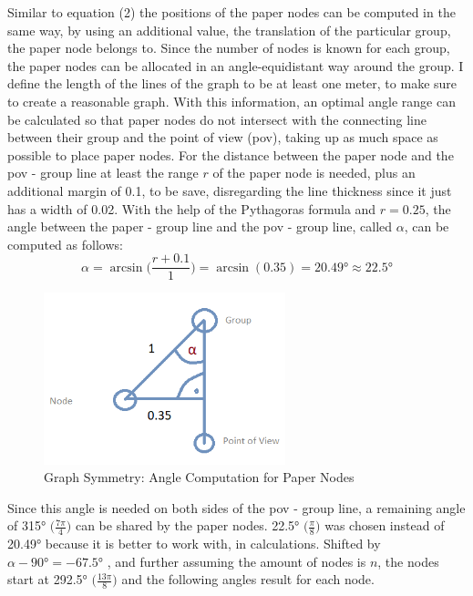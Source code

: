 \documentclass[12pt,a4paper,oneside,american,parskip=half]{article}
\begin{document}
\begin{justify}
\begin{normalsize}
\newline
Similar to equation (2) the positions of the paper nodes can be computed in the same way, by using an additional value, the translation of the particular group, the paper node belongs to.
Since the number of nodes is known for each group, the paper nodes can be allocated in an angle-equidistant way around the group. 
\newline
I define the length of the lines of the graph to be at least one meter, to make sure to create a reasonable graph.
With this information, an optimal angle range can be calculated so that paper nodes do not intersect with the connecting line between their group and the point of view (pov), taking up as much space as possible to place paper nodes.
For the distance between the paper node and the pov - group line at least the range $r$ of the paper node is needed, plus an additional margin of 0.1, to be save, disregarding the line thickness since it just has a width of 0.02.
With the help of the Pythagoras formula and $r = 0.25$, the angle between the paper - group line and the pov - group line, called $\alpha$, can be computed as follows:
\begin{equation*}
\alpha = \arcsin \Big(\frac{r + 0.1}{1}\Big) = \arcsin (0.35) = 20.49° \approx 22.5°
\end{equation*}
%
%
\begin{figure}[h!]
\centering
\includegraphics[width=7cm]{angle.png}
\caption{Graph Symmetry: Angle Computation for Paper Nodes}
\end{figure}
\newline
Since this angle is needed on both sides of the pov - group line, a remaining angle of 315° $\big(\frac{7\pi}{4}\big)$ can be shared by the paper nodes. 22.5° $\big(\frac{\pi}{8}\big)$ was chosen instead of 20.49° because it is better to work with, in calculations.
Shifted by $\alpha - 90° = - 67.5°$ , and further assuming the amount of nodes is $n$, the nodes start at 292.5° $\big(\frac{13\pi}{8}\big)$ and the following angles result for each node.
\begin{equation*}

\end{equation*}
\end{normalsize}
\end{justify}
\end{document}
